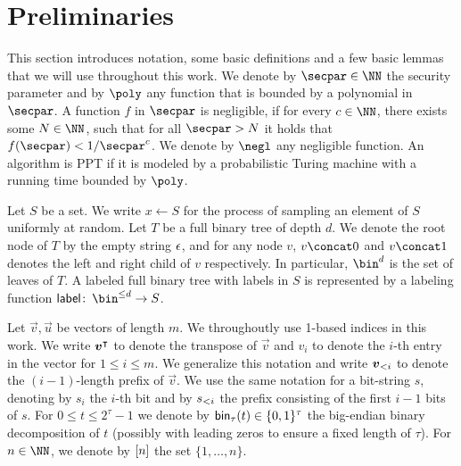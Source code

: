 \section{Preliminaries}\label{sec:prelim}
This section introduces notation, some basic definitions and a few basic lemmas that we will use throughout this work.
We denote by $\secpar\in\NN$ the security parameter and by $\poly$ any function that is bounded by a polynomial in $\secpar$.
A function $f$ in $\secpar$ is negligible, if for every $c \in \NN$, there exists some $N\in\NN$, such that for all $\secpar>N$ it holds that $f(\secpar) < 1/\secpar^c$.
We denote by $\negl$ any negligible function.
An algorithm is PPT if it is modeled by a probabilistic Turing machine with a running time bounded by $\poly$.

Let $S$ be a set.
We write $x\gets S$ for the process of sampling an element of $S$ uniformly at random.
Let $T$ be a full binary tree of depth $d$.
We denote the root node of $T$ by the empty string $\epsilon$, and for any node $v$, $v\concat 0$ and $v\concat 1$ denotes the left and right child of $v$ respectively.
In particular, $\bin^d$ is the set of leaves of $T$.
A labeled full binary tree with labels in $S$ is represented by a labeling function $\lbl\colon\, \bin^{\leq d} \to S$.

Let $\vec{v},\vec{u}$ be vectors of length $m$.
We throughoutly use 1-based indices in this work.
We write $\boldsymbol{v}^\intercal$ to denote the transpose of $\vec{v}$ and $v_i$ to denote the $i$-th entry in the vector for $1\leq i \leq m$.
We generalize this notation and write $\boldsymbol{v}_{<i}$ to denote the $(i-1)$-length prefix of $\vec{v}$.
We use the same notation for a bit-string $s$, denoting by $s_i$ the $i$-th bit and by $s_{<i}$ the prefix consisting of the first $i-1$ bits of $s$.
For $0\leq t \leq 2^\tau-1$ we denote by $\mathsf{bin}_{\tau}(t)\in\{0,1\}^\tau$ the big-endian binary decomposition of $t$ (possibly with leading zeros to ensure a fixed length of $\tau$).
For $n\in\NN$, we denote by $[n]$ the set $\{1,\dots,n\}$.

